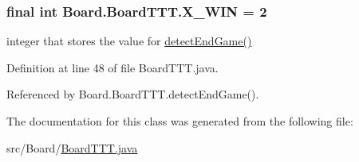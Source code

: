 \subsubsection[{X\+\_\+\+W\+I\+N}]{\setlength{\rightskip}{0pt plus 5cm}final int Board.\+Board\+T\+T\+T.\+X\+\_\+\+W\+I\+N = 2\hspace{0.3cm}{\ttfamily [static]}}\label{class_board_1_1_board_t_t_t_ab77ee706643fb1825e78f6b8dcacc021}
integer that stores the value for \hyperlink{class_board_1_1_board_t_t_t_a08f36da4210111d8f129be28a550334e}{detect\+End\+Game()} 

Definition at line 48 of file Board\+T\+T\+T.\+java.



Referenced by Board.\+Board\+T\+T\+T.\+detect\+End\+Game().



The documentation for this class was generated from the following file\+:\begin{DoxyCompactItemize}
\item 
src/\+Board/\hyperlink{_board_t_t_t_8java}{Board\+T\+T\+T.\+java}\end{DoxyCompactItemize}

